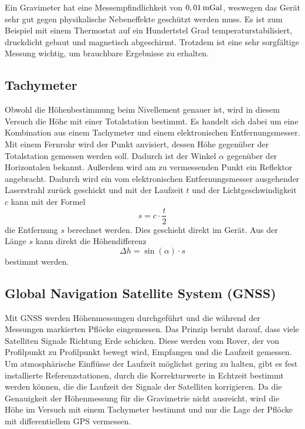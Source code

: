 Ein Gravimeter hat eine Messempfindlichkeit von $0,01\,\mathrm{mGal}$, weswegen das Gerät sehr gut gegen physikalische Nebeneffekte geschützt werden muss. Es ist zum Beispiel mit einem Thermostat auf ein Hundertstel Grad temperaturstabilisiert, druckdicht gebaut und magnetisch abgeschirmt. Trotzdem ist eine sehr sorgfältige Messung wichtig, um brauchbare Ergebnisse zu erhalten. 

\subsection{Tachymeter}

Obwohl die Höhenbestimmung beim Nivellement genauer ist, wird in diesem Versuch die Höhe mit einer Totalstation bestimmt. Es handelt sich dabei um eine Kombination aus einem Tachymeter und einem elektronischen Entfernungsmesser. Mit einem Fernrohr wird der Punkt anvisiert, dessen Höhe gegenüber der Totalstation gemessen werden soll. Dadurch ist der Winkel $\alpha$ gegenüber der Horizontalen bekannt. Außerdem wird am zu vermessenden Punkt ein Reflektor angebracht. Dadurch wird ein vom elektronischen Entfernungsmesser ausgehender Laserstrahl zurück geschickt und mit der Laufzeit $t$ und der Lichtgeschwindigkeit $c$ kann mit der Formel
\begin{equation}
 s=c\cdot \frac{t}{2}
\end{equation}
die Entfernung $s$ berechnet werden. Dies geschieht direkt im Gerät. Aus der Länge $s$ kann direkt die Höhendifferenz
\begin{equation}
 \Delta h=\sin(\alpha)\cdot s
\end{equation}
bestimmt werden. 

\newpage
\subsection{Global Navigation Satellite System (GNSS)}

Mit GNSS werden Höhenmessungen durchgeführt und die während der Messungen markierten Pflöcke eingemessen. Das Prinzip beruht darauf, dass viele Satelliten Signale Richtung Erde schicken. Diese werden vom Rover, der von Profilpunkt zu Profilpunkt bewegt wird, Empfangen und die Laufzeit gemessen. Um atmosphärische Einflüsse der Laufzeit möglichst gering zu halten, gibt es fest installierte Referenzstationen, durch die Korrekturwerte in Echtzeit bestimmt werden können, die die Laufzeit der Signale der Satelliten korrigieren. 
Da die Genauigkeit der Höhenmessung für die Gravimetrie nicht ausreicht, wird die Höhe im Versuch mit einem Tachymeter bestimmt und nur die Lage der Pflöcke mit differentiellem GPS vermessen. 
